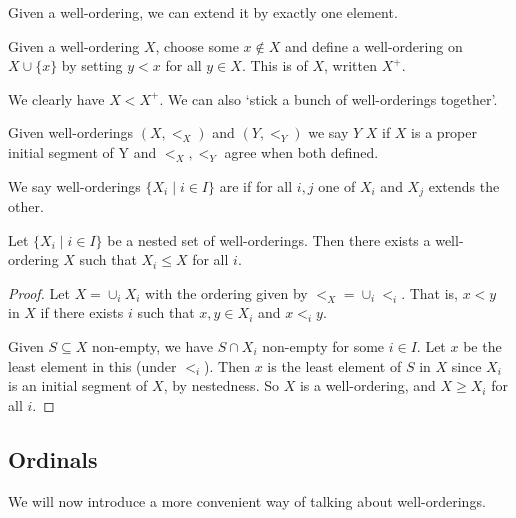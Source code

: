\documentclass[a4paper, 10pt, twocolumn]{amsart}
\begin{document}

Given a well-ordering, we can extend it by exactly one element.

\begin{definition}[Successor]
  Given a well-ordering $X$, choose some $x \not \in X$ and define a well-ordering on $X \cup \{x\}$ by setting $y < x$
  for all $y \in X$. This is  of $X$, written $X^+$. 
\end{definition}
We clearly have $X < X^+$.
We can also `stick a bunch of well-orderings together'.

\begin{definition}[Extensions]
  Given well-orderings $(X, <_X)$ and $(Y, <_Y)$ we say $Y$  $X$ if $X$ is a proper initial segment of Y and $<_X, <_Y$ agree when both defined.

We say well-orderings $\{X_i \mid i \in I\}$ are  if for all $i, j$ one of $X_i$ and $X_j$ extends the other.
\end{definition}

\begin{proposition}  
  Let $\{X_i \mid i \in I\}$ be a nested set of well-orderings. Then there exists a well-ordering $X$ such that $X_i \leq X$ for all $i$.
\end{proposition}
\begin{proof}
  Let $X = \cup_i X_i$ with the ordering given by $<_X = \cup_i <_i$. That is, $x < y$ in $X$ if there exists $i$ such that $x, y \in X_i$ and $x <_i y$.

  Given $S \subseteq X$ non-empty, we have $S \cap X_i$ non-empty for some $i\in I$. Let $x$ be the least element in this (under $<_i$). Then $x$ is the least element of $S$ in $X$ since $X_i$ is an initial segment of $X$, by nestedness. So $X$ is a well-ordering, and $X \geq X_i$ for all $i$.
\end{proof}


\subsection{Ordinals}

We will now introduce a more convenient way of talking about well-orderings.
\end{document}

